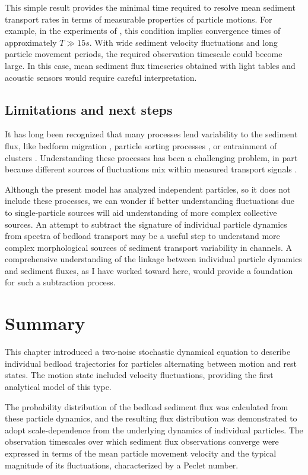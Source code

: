 This simple result provides the minimal time required to resolve mean sediment transport rates in terms of measurable properties of particle motions. For example, in the experiments of \citet{Martin2012}, this condition implies convergence times of approximately $T \gg 15 s$. With wide sediment velocity fluctuations and long particle movement periods, the required observation timescale could become large.
In this case, mean sediment flux timeseries obtained with light tables and acoustic sensors \citep{Zimmermann2008,Tsakiris2014,Mendes2016} would require careful interpretation.

\subsection{Limitations and next steps}

It has long been recognized that many processes lend variability to the sediment flux, like bedform migration \citep{Hamamori1962,Guala2014}, particle sorting processes \citep{}, or entrainment of clusters \citep{Strom2004,Papanicolaou2018}.
Understanding these processes has been a challenging problem, in part because different sources of fluctuations mix within measured transport signals \citep[e.g.][]{Hoey1992,Singh2009,Saletti2015,Dhont2018}.

Although the present model has analyzed independent particles, so it does not include these processes, we can wonder if better understanding fluctuations due to single-particle sources will aid understanding of more complex collective sources.
An attempt to subtract the signature of individual particle dynamics from spectra of bedload transport may be a useful step to understand more complex morphological sources of sediment transport variability in channels.
A comprehensive understanding of the linkage between individual particle dynamics and sediment fluxes, as I have worked toward here, would provide a foundation for such a subtraction process.

\section{Summary \label{sec:conc}} 
This chapter introduced a two-noise stochastic dynamical equation to describe individual bedload trajectories for particles alternating between motion and rest states. The motion state included velocity fluctuations, providing the first analytical model of this type.
 
The probability distribution of the bedload sediment flux was calculated from these particle dynamics, and the resulting flux distribution was demonstrated to adopt scale-dependence from the underlying dynamics of individual particles.
The observation timescales over which sediment flux observations converge were expressed in terms of the mean particle movement velocity and the typical magnitude of its fluctuations, characterized by a Peclet number.
 
